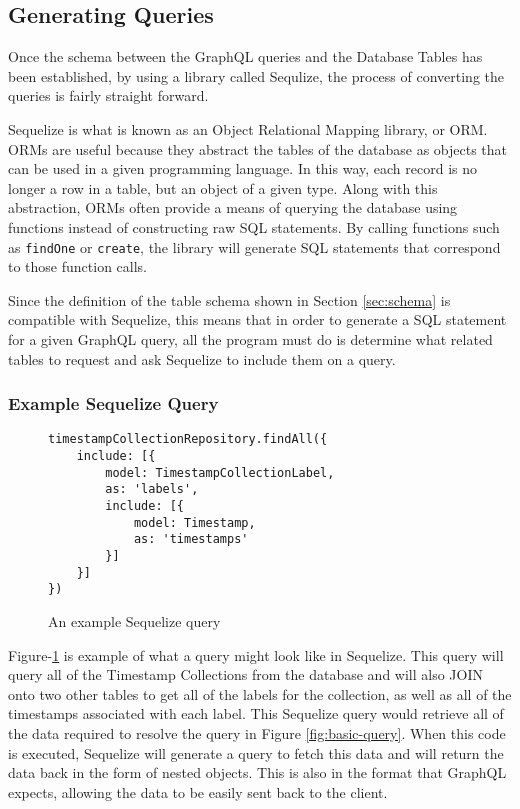 \subsection{Generating Queries}

Once the schema between the GraphQL queries and the Database Tables has been established, by using a library called Sequlize, the process of converting the queries is fairly straight forward.

Sequelize is what is known as an Object Relational Mapping library, or ORM.  ORMs are useful because they abstract the tables of the database as objects that can be used in a given programming language.  In this way, each record is no longer a row in a table, but an object of a given type.  Along with this abstraction, ORMs often provide a means of querying the database using functions instead of constructing raw SQL statements.  By calling functions such as \Verb!findOne! or \Verb!create!, the library will generate SQL statements that correspond to those function calls.

Since the definition of the table schema shown in Section \ref{sec:schema} is compatible with Sequelize, this means that in order to generate a SQL statement for a given GraphQL query, all the program must do is determine what related tables to request and ask Sequelize to include them on a query.

\subsubsection{Example Sequelize Query}

\begin{figure}
    \begin{verbatim}
timestampCollectionRepository.findAll({
    include: [{
        model: TimestampCollectionLabel,
        as: 'labels',
        include: [{
            model: Timestamp,
            as: 'timestamps'
        }]
    }]
})
    \end{verbatim}
    \caption{An example Sequelize query}
    \label{fig:sequelize-query}
\end{figure}

Figure-\ref{fig:sequelize-query} is example of what a query might look like in Sequelize.  This query will query all of the Timestamp Collections from the database and will also JOIN onto two other tables to get all of the labels for the collection, as well as all of the timestamps associated with each label.  This Sequelize query would retrieve all of the data required to resolve the query in Figure \ref{fig:basic-query}.  When this code is executed, Sequelize will generate a query to fetch this data and will return the data back in the form of nested objects.  This is also in the format that GraphQL expects, allowing the data to be easily sent back to the client.

